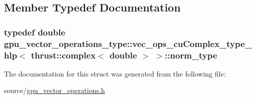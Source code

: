 \subsection{Member Typedef Documentation}
\hypertarget{structgpu__vector__operations__type_1_1vec__ops__cuComplex__type__hlp_3_01thrust_1_1complex_3_01double_01_4_01_4_a39900bbd4d214f56f565eba71c33bce0}{
\subsubsection[{norm\-\_\-type}]{\setlength{\rightskip}{0pt plus 5cm}typedef double {\bf gpu\-\_\-vector\-\_\-operations\-\_\-type\-::vec\-\_\-ops\-\_\-cu\-Complex\-\_\-type\-\_\-hlp}$<$ {\bf thrust\-::complex}$<$ double $>$ $>$\-::{\bf norm\-\_\-type}}}\label{structgpu__vector__operations__type_1_1vec__ops__cuComplex__type__hlp_3_01thrust_1_1complex_3_01double_01_4_01_4_a39900bbd4d214f56f565eba71c33bce0}


The documentation for this struct was generated from the following file\-:\begin{DoxyCompactItemize}
\item 
source/\hyperlink{gpu__vector__operations_8h}{gpu\-\_\-vector\-\_\-operations.\-h}\end{DoxyCompactItemize}
